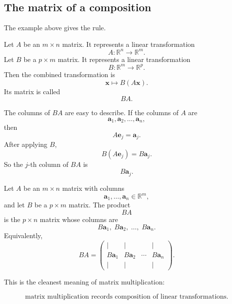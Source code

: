 \subsection{The matrix of a composition}

The example above gives the rule.

Let \(A\) be an \(m\times n\) matrix.  It represents a linear transformation
\[
    A:\mathbb R^n\to\mathbb R^m.
\]
Let \(B\) be a \(p\times m\) matrix.  It represents a linear transformation
\[
    B:\mathbb R^m\to\mathbb R^p.
\]
Then the combined transformation is
\[
    \mathbf x\longmapsto B(A\mathbf x).
\]
Its matrix is called
\[
    BA.
\]

The columns of \(BA\) are easy to describe.  If the columns of \(A\) are
\[
    \mathbf a_1,\mathbf a_2,\ldots,\mathbf a_n,
\]
then
\[
    A\mathbf e_j=\mathbf a_j.
\]
After applying \(B\),
\[
    B(A\mathbf e_j)=B\mathbf a_j.
\]
So the \(j\)-th column of \(BA\) is
\[
    B\mathbf a_j.
\]

\begin{definition}
Let \(A\) be an \(m\times n\) matrix with columns
\[
    \mathbf a_1,\ldots,\mathbf a_n\in\mathbb R^m,
\]
and let \(B\) be a \(p\times m\) matrix.  The product
\[
    BA
\]
is the \(p\times n\) matrix whose columns are
\[
    B\mathbf a_1,\;B\mathbf a_2,\;\ldots,\;B\mathbf a_n.
\]
Equivalently,
\[
\boxed{
    BA=
    \begin{pmatrix}
        |&|&&|\\
        B\mathbf a_1&B\mathbf a_2&\cdots&B\mathbf a_n\\
        |&|&&|
    \end{pmatrix}.
}
\]
\end{definition}

This is the cleanest meaning of matrix multiplication:

\[
\boxed{
    \text{matrix multiplication records composition of linear transformations.}
}
\]

